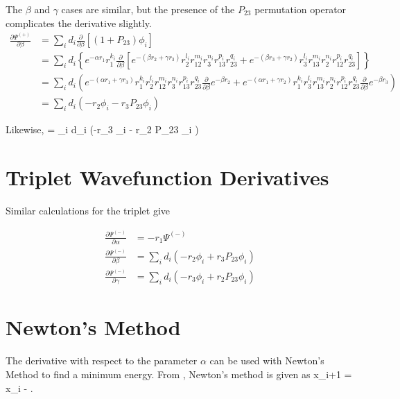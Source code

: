 \documentclass[Dissertation.tex]{subfiles}
\begin{document}
The $\beta$ and $\gamma$ cases are similar, but the presence of the $P_{23}$ permutation operator complicates the derivative slightly.
\begin{align}
\nonumber \frac{\partial \Psi^{(+)}}{\partial \beta} &= \sum_i d_i \frac{\partial}{\partial \beta} \left[(1+P_{23}) \phi_i \right] \\
\nonumber &= \sum_i d_i \left\{
  e^{-\alpha r_1} r_1^{k_i} \frac{\partial}{\partial \beta}
  \left[e^{-(\beta r_2 + \gamma r_3)} r_2^{l_i} r_{12}^{m_i} r_3^{n_i} r_{13}^{p_i} r_{23}^{q_i}
      + e^{-(\beta r_3 + \gamma r_2)} r_3^{l_i} r_{13}^{m_i} r_2^{n_i} r_{12}^{p_i} r_{23}^{q_i} \right] \right\} \\
\nonumber &= \sum_i d_i \left(
  e^{-(\alpha r_1 + \gamma r_3)} r_1^{k_i} r_2^{l_i} r_{12}^{m_i} r_3^{n_i} r_{13}^{p_i} r_{23}^{q_i} \frac{\partial}{\partial \beta} e^{-\beta r_2} +
  e^{-(\alpha r_1 + \gamma r_2)} r_1^{k_i} r_3^{l_i} r_{13}^{m_i} r_2^{n_i} r_{12}^{p_i} r_{23}^{q_i} \frac{\partial}{\partial \beta} e^{-\beta r_3} \right) \\
 &= \sum_i d_i \left(-r_2 \phi_i - r_3 P_{23} \phi_i \right) 
\label{eq:PsiDerBeta}
\end{align}

Likewise,
\beq
\frac{\partial \Psi^{(+)}}{\partial \gamma} = \sum_i d_i \left(-r_3 \phi_i - r_2 P_{23} \phi_i \right)
\label{eq:PsiDerGamma}
\eeq


\section{Triplet Wavefunction Derivatives}
Similar calculations for the triplet give

\begin{align}
\frac{\partial \Psi^{(-)}}{\partial \alpha} &= -r_1 \Psi^{(-)} \label{eq:PsiTripletDerAlpha} \\
\frac{\partial \Psi^{(-)}}{\partial \beta} &= \sum_i d_i \left(-r_2 \phi_i + r_3 P_{23} \phi_i \right) \label{eq:PsiTripletDerBeta} \\
\frac{\partial \Psi^{(-)}}{\partial \gamma} &= \sum_i d_i \left(-r_3 \phi_i + r_2 P_{23} \phi_i \right) \label{eq:PsiTripletDerGamma}
\end{align}

\section{Newton's Method}
The derivative with respect to the parameter $\alpha$ can be used with Newton's Method to find a minimum energy.  From \cite{Sauer2006}, Newton's method is given as
\beq
x_{i+1} = x_i - .
\label{eq:NewtonMethod}
\eeq
\end{document}
